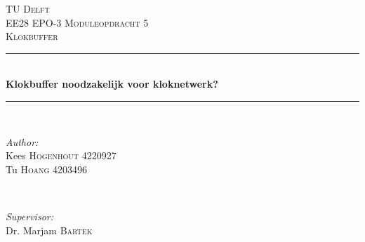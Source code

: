 \begin{titlepage}

\newcommand{\HRule}{\rule{\linewidth}{0.5mm}} %

\center %
 

\textsc{\LARGE TU Delft}\\[1.5cm] %
\textsc{\Large EE28 EPO-3 Moduleopdracht 5}\\[0.5cm] %
\textsc{\large Klokbuffer}\\[0.5cm] %


\HRule \\[0.4cm]
{ \huge \bfseries Klokbuffer  noodzakelijk voor kloknetwerk?}\\[0.4cm] %
\HRule \\[1.5cm]
 

\begin{minipage}{0.4\textwidth}
\begin{flushleft} \large
\emph{Author:}\\
Kees \textsc{Hogenhout} 4220927\\ %
Tu \textsc{Hoang} 4203496 %
\end{flushleft}
\end{minipage}
~
\begin{minipage}{0.4\textwidth}
\begin{flushright} \large
\emph{Supervisor:} \\
Dr. Marjam \textsc{Bartek} %
\end{flushright}
\end{minipage}\\[4cm]


\end{titlepage}
